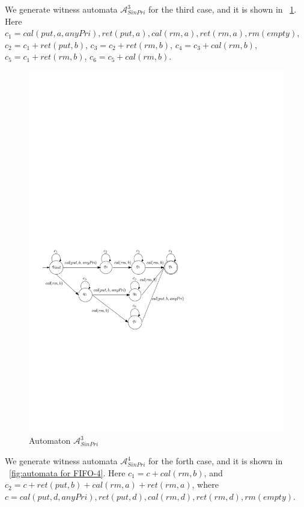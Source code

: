 We generate witness automata $\mathcal{A}_{\textit{SinPri}}^3$ for the third case, and it is shown in \figurename~\ref{fig:automata for FIFO-3}. Here $c_1 = \textit{cal}(\textit{put},a,\textit{anyPri}),\textit{ret}(\textit{put},a), \textit{cal}(\textit{rm},a),\textit{ret}(\textit{rm},a),\textit{rm}(\textit{empty})$, $c_2 = c_1 + \textit{ret}(\textit{put},b)$, $c_3 = c_2 + \textit{ret}(\textit{rm},b)$, $c_4 = c_3 + \textit{cal}(\textit{rm},b)$, $c_5 = c_1 + \textit{ret}(\textit{rm},b)$, $c_6 = c_5 + \textit{cal}(\textit{rm},b)$.

\begin{figure}[htbp]
  \centering
  \includegraphics[width=0.7 \textwidth]{figures/PIC_AUTO_FIFO_3.pdf}
  \caption{Automaton $\mathcal{A}_{\textit{SinPri}}^3$}
  \label{fig:automata for FIFO-3}
\end{figure}

We generate witness automata $\mathcal{A}_{\textit{SinPri}}^4$ for the forth case, and it is shown in \figurename~\ref{fig:automata for FIFO-4}. Here $c_1 = c + \textit{cal}(\textit{rm},b)$, and $c_2 = c + \textit{ret}(\textit{put},b) + \textit{cal}(\textit{rm},a) + \textit{ret}(\textit{rm},a)$, where $c = \textit{cal}(\textit{put},d,\textit{anyPri}),\textit{ret}(\textit{put},d), \textit{cal}(\textit{rm},d),\textit{ret}(\textit{rm},d),\textit{rm}(\textit{empty})$.

